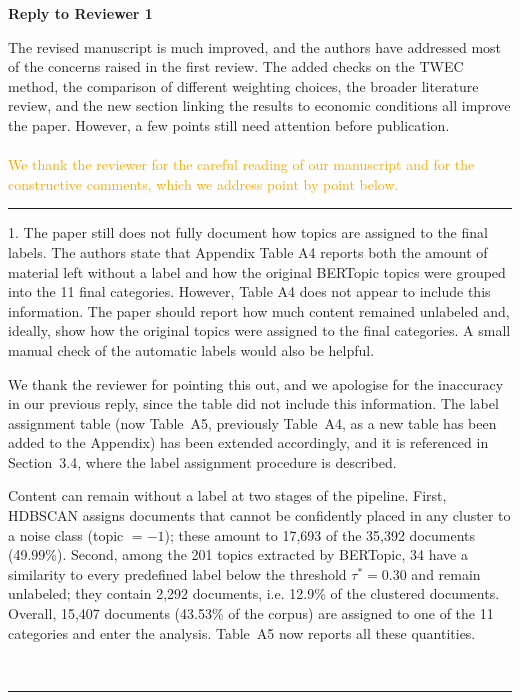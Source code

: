 \documentclass{report}
\newcommand{\revrepl}[1]{\textcolor{orange}{#1}}
\theoremstyle{plain}
\begin{document}
\newpage
\begin{center} \textbf{Reply to Reviewer 1} \end{center}
\vspace{0.5cm}
%
%
The revised manuscript is much improved, and the authors have addressed most of the concerns raised in the first review. The added checks on the TWEC method, the comparison of different weighting choices, the broader literature review, and the new section linking the results to economic conditions all improve the paper. However, a few points still need attention before publication.
\\
\\ \revrepl{We thank the reviewer for the careful reading of our manuscript and for the constructive comments, which we address point by point below.}\\
\noindent\rule{15cm}{0.4pt}

1. The paper still does not fully document how topics are assigned to the final labels. The authors state that Appendix Table A4 reports both the amount of material left without a label and how the original BERTopic topics were grouped into the 11 final categories. However, Table A4 does not appear to include this information. The paper should report how much content remained unlabeled and, ideally, show how the original topics were assigned to the final categories. A small manual check of the automatic labels would also be helpful.
\\
{\color{orange}
We thank the reviewer for pointing this out, and we apologise for the inaccuracy in our previous reply, since the table did not include this information. The label assignment table (now Table~A5, previously Table~A4, as a new table has been added to the Appendix) has been extended accordingly, and it is referenced in Section~3.4, where the label assignment procedure is described.

Content can remain without a label at two stages of the pipeline. First, HDBSCAN assigns documents that cannot be confidently placed in any cluster to a noise class (topic $=-1$); these amount to 17,693 of the 35,392 documents (49.99\%). Second, among the 201 topics extracted by BERTopic, 34 have a similarity to every predefined label below the threshold $\tau^* = 0.30$ and remain unlabeled; they contain 2,292 documents, i.e. 12.9\% of the clustered documents. Overall, 15,407 documents (43.53\% of the corpus) are assigned to one of the 11 categories and enter the analysis. Table~A5 now reports all these quantities.
}
\\
\noindent\rule{15cm}{0.4pt}
\end{document}
